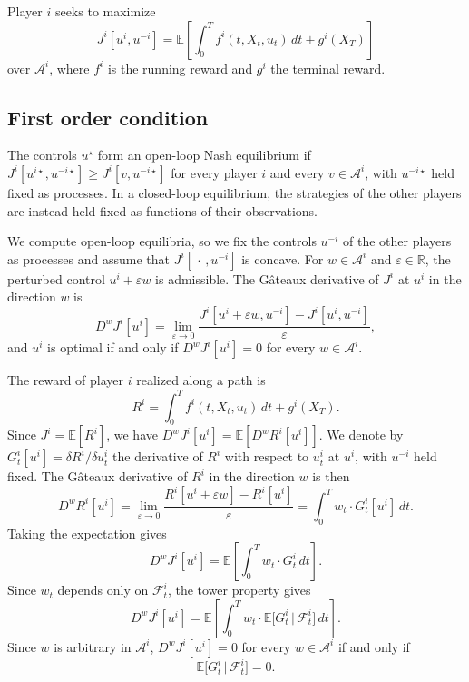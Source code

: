 \documentclass[11pt]{article}
\newcommand{\E}{\mathbb{E}}
\newcommand{\R}{\mathbb{R}}
\newcommand{\F}{\mathcal{F}}
\begin{document}
Player $i$ seeks to maximize
\begin{equation}
  \label{eq:objective}
  J^i[u^i, u^{-i}] = \E\!\left[ \int_0^T f^i(t, X_t, u_t) \, dt + g^i(X_T) \right]
\end{equation}
over $\mathcal{A}^i$, where $f^i$ is the running reward and $g^i$ the terminal reward.

\subsection{First order condition}
\label{sec:foc}

The controls $u^\star$ form an open-loop Nash equilibrium if $J^i[u^{i\star}, u^{-i\star}] \ge J^i[v, u^{-i\star}]$ for every player $i$ and every $v \in \mathcal{A}^i$, with $u^{-i\star}$ held fixed as processes. In a closed-loop equilibrium, the strategies of the other players are instead held fixed as functions of their observations.

We compute open-loop equilibria, so we fix the controls $u^{-i}$ of the other players as processes and assume that $J^i[\,\cdot\,, u^{-i}]$ is concave. For $w \in \mathcal{A}^i$ and $\varepsilon \in \R$, the perturbed control $u^i + \varepsilon w$ is admissible. The G\^ateaux derivative of $J^i$ at $u^i$ in the direction $w$ is
\begin{equation*}
  D^w J^i[u^i] = \lim_{\varepsilon \to 0} \frac{J^i[u^i + \varepsilon w, u^{-i}] - J^i[u^i, u^{-i}]}{\varepsilon} ,
\end{equation*}
and $u^i$ is optimal if and only if $D^w J^i[u^i] = 0$ for every $w \in \mathcal{A}^i$.

The reward of player $i$ realized along a path is
\begin{equation*}
  R^i = \int_0^T f^i(t, X_t, u_t) \, dt + g^i(X_T) .
\end{equation*}
Since $J^i = \E[R^i]$, we have $D^w J^i[u^i] = \E[D^w R^i[u^i]]$. We denote by $G^i_t[u^i] = \delta R^i / \delta u^i_t$ the derivative of $R^i$ with respect to $u^i_t$ at $u^i$, with $u^{-i}$ held fixed. The G\^ateaux derivative of $R^i$ in the direction $w$ is then
\begin{equation*}
  D^w R^i[u^i] = \lim_{\varepsilon \to 0} \frac{R^i[u^i + \varepsilon w] - R^i[u^i]}{\varepsilon} = \int_0^T w_t \cdot G^i_t[u^i] \, dt .
\end{equation*}
Taking the expectation gives
\begin{equation*}
  D^w J^i[u^i] = \E\left[ \int_0^T w_t \cdot G^i_t \, dt \right] .
\end{equation*}
Since $w_t$ depends only on $\F^i_t$, the tower property gives
\begin{equation*}
  D^w J^i[u^i] = \E\left[ \int_0^T w_t \cdot \E\big[ G^i_t \,\big|\, \F^i_t \big] \, dt \right] .
\end{equation*}
Since $w$ is arbitrary in $\mathcal{A}^i$, $D^w J^i[u^i] = 0$ for every $w \in \mathcal{A}^i$ if and only if
\begin{equation}
  \label{eq:foc}
  \E\big[ G^i_t \,\big|\, \F^i_t \big] = 0 .
\end{equation}
\end{document}
